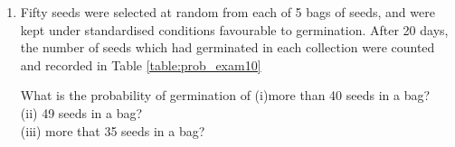 \begin{enumerate}[label=\thesection.\arabic*.,ref=\thesection.\theenumi]
%
\begin{table}[!ht]
\centering
{}
\caption{}
\label{table:prob_exam9}
\end{table}
\solution

\item Fifty seeds were selected at random from each of 5 bags of seeds, and were kept under standardised conditions favourable to germination. After 20 days, the
number of seeds which had germinated in each collection were counted and recorded in Table \ref{table:prob_exam10}

What is the probability of germination of
(i)more than 40 seeds in a bag?\\
(ii) 49 seeds in a bag?\\
(iii) more that 35 seeds in a bag?\\


\end{enumerate}
